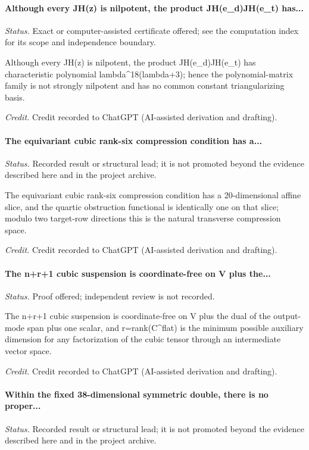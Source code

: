 \label{supp-note-05-022}
\paragraph{Although every JH(z) is nilpotent, the product JH(e\_d)JH(e\_t) has...}
\emph{Status.} Exact or computer-assisted certificate offered; see the computation index for its scope and independence boundary.

Although every JH(z) is nilpotent, the product JH(e\_d)JH(e\_t) has characteristic polynomial lambda\textasciicircum{}18(lambda+3); hence the polynomial-matrix family is not strongly nilpotent and has no common constant triangularizing basis.

\emph{Credit.} Credit recorded to ChatGPT (AI-assisted derivation and drafting).

\label{supp-note-05-023}
\paragraph{The equivariant cubic rank-six compression condition has a...}
\emph{Status.} Recorded result or structural lead; it is not promoted beyond the evidence described here and in the project archive.

The equivariant cubic rank-six compression condition has a 20-dimensional affine slice, and the quartic obstruction functional is identically one on that slice; modulo two target-row directions this is the natural transverse compression space.

\emph{Credit.} Credit recorded to ChatGPT (AI-assisted derivation and drafting).

\label{supp-note-05-024}
\paragraph{The n+r+1 cubic suspension is coordinate-free on V plus the...}
\emph{Status.} Proof offered; independent review is not recorded.

The n+r+1 cubic suspension is coordinate-free on V plus the dual of the output-mode span plus one scalar, and r=rank(C\textasciicircum{}flat) is the minimum possible auxiliary dimension for any factorization of the cubic tensor through an intermediate vector space.

\emph{Credit.} Credit recorded to ChatGPT (AI-assisted derivation and drafting).

\label{supp-note-05-025}
\paragraph{Within the fixed 38-dimensional symmetric double, there is no proper...}
\emph{Status.} Recorded result or structural lead; it is not promoted beyond the evidence described here and in the project archive.

